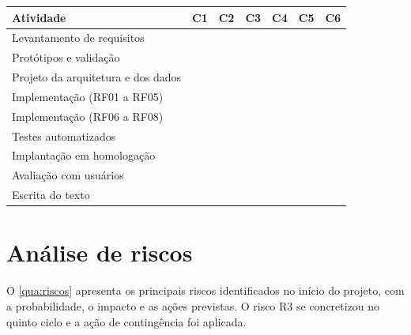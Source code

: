 \newcommand{\feito}{\cellcolor{gray!45}}
\begin{quadro}[htbp]
  \centering
  \caption{Cronograma realizado por ciclo de desenvolvimento}
  \label{qua:cronograma}
  \small
  \begin{tabular}{|l|c|c|c|c|c|c|}
    \hline
    \textbf{Atividade} & \textbf{C1} & \textbf{C2} & \textbf{C3} &
      \textbf{C4} & \textbf{C5} & \textbf{C6} \\
    \hline
    Levantamento de requisitos         & \feito & \feito &        &        &        &        \\
    \hline
    Protótipos e validação             &        & \feito &        &        &        &        \\
    \hline
    Projeto da arquitetura e dos dados &        & \feito & \feito &        &        &        \\
    \hline
    Implementação (RF01 a RF05)        &        &        & \feito & \feito &        &        \\
    \hline
    Implementação (RF06 a RF08)        &        &        &        & \feito & \feito &        \\
    \hline
    Testes automatizados               &        &        & \feito & \feito & \feito &        \\
    \hline
    Implantação em homologação         &        &        &        &        & \feito &        \\
    \hline
    Avaliação com usuários             &        &        &        &        &        & \feito \\
    \hline
    Escrita do texto                   & \feito &        &        & \feito & \feito & \feito \\
    \hline
  \end{tabular}
\end{quadro}

\section{Análise de riscos}

O \cref{qua:riscos} apresenta os principais riscos identificados no início do
projeto, com a probabilidade, o impacto e as ações previstas. O risco R3 se
concretizou no quinto ciclo e a ação de contingência foi aplicada.

